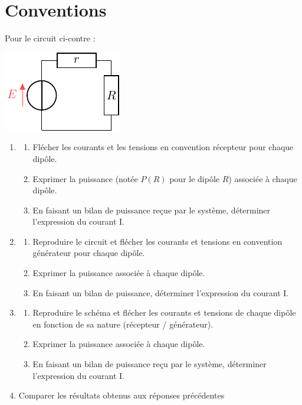 \documentclass[../../main/main.tex]{subfiles}
\begin{document}
\section{Conventions}

\begin{minipage}{0.30\linewidth}
	Pour le circuit ci-contre :
\end{minipage}
\begin{minipage}{0.70\linewidth}
	\begin{center}
		\includegraphics[width=.3\linewidth]{convs_plain}
	\end{center}
\end{minipage}
\begin{enumerate}
	\item
	      \begin{enumerate}
		      \item Flécher les courants et les tensions en convention récepteur
		            pour chaque dipôle.
		      \item Exprimer la puissance (notée $P(R)$ pour le dipôle $R$) associée
		            à chaque dipôle.
		      \item En faisant un bilan de puissance reçue par le système,
		            déterminer l'expression du courant I.
	      \end{enumerate}
	\item
	      \begin{enumerate}
		      \item Reproduire le circuit et flécher les courants et tensions en
		            convention générateur pour chaque dipôle.
		      \item Exprimer la puissance associée à chaque dipôle.
		      \item En faisant un bilan de puissance, déterminer l'expression du
		            courant I.
	      \end{enumerate}
	\item
	      \begin{enumerate}
		      \item Reproduire le schéma et flécher les courants et tensions de
		            chaque dipôle en fonction de sa nature (récepteur / générateur).
		      \item Exprimer la puissance associée à chaque dipôle.
		      \item En faisant un bilan de puissance reçu par le système,
		            déterminer l'expression du courant I.
	      \end{enumerate}
	\item Comparer les résultats obtenus aux réponses précédentes
\end{enumerate}
\end{document}
